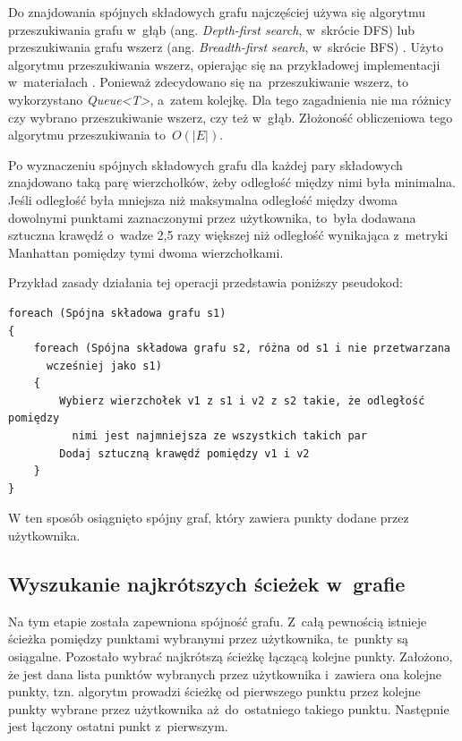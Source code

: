 \documentclass[a4paper,11pt,twoside,openright]{report}
\theoremstyle{definition}
\begin{document}
Do znajdowania spójnych składowych grafu najczęściej używa się algorytmu
przeszukiwania grafu w~głąb (ang. \textit{Depth-first search}, w~skrócie DFS) lub
przeszukiwania grafu wszerz (ang. \textit{Breadth-first search}, w~skrócie BFS)
\cite{Algorytmy Sedgewick}. Użyto algorytmu przeszukiwania wszerz, opierając się
na przykładowej implementacji w~materiałach \cite{AiSD2}. Ponieważ zdecydowano się
na~przeszukiwanie wszerz, to wykorzystano \textit{Queue<T>}, a~zatem kolejkę. Dla tego zagadnienia
nie ma różnicy czy wybrano przeszukiwanie wszerz, czy też w~głąb. Złożoność
obliczeniowa tego algorytmu przeszukiwania to~$O(|E|)$.

Po wyznaczeniu spójnych składowych grafu dla każdej pary składowych znajdowano
taką parę wierzchołków, żeby odległość między nimi była minimalna. Jeśli odległość
była mniejsza niż maksymalna odległość między dwoma dowolnymi punktami zaznaczonymi
przez użytkownika, to~była dodawana sztuczna krawędź o~wadze 2,5 razy większej
niż odległość wynikająca z~metryki Manhattan pomiędzy tymi dwoma wierzchołkami.

Przykład zasady działania tej operacji przedstawia poniższy pseudokod:

\begin{verbatim}
foreach (Spójna składowa grafu s1)
{
    foreach (Spójna składowa grafu s2, różna od s1 i nie przetwarzana
      wcześniej jako s1)
    {
        Wybierz wierzchołek v1 z s1 i v2 z s2 takie, że odległość pomiędzy
          nimi jest najmniejsza ze wszystkich takich par
        Dodaj sztuczną krawędź pomiędzy v1 i v2
    }
}
\end{verbatim}


W ten sposób osiągnięto spójny graf, który zawiera punkty dodane przez użytkownika.

\subsection {Wyszukanie najkrótszych ścieżek w~grafie}

Na tym etapie została zapewniona spójność grafu. Z~całą pewnością istnieje ścieżka
pomiędzy punktami wybranymi przez użytkownika, te~punkty są osiągalne. Pozostało
wybrać najkrótszą ścieżkę łączącą kolejne punkty. Założono, że jest dana lista
punktów wybranych przez użytkownika i~zawiera ona kolejne punkty, tzn. algorytm
prowadzi ścieżkę od pierwszego punktu przez kolejne punkty wybrane przez użytkownika
aż~do~ostatniego takiego punktu. Następnie jest łączony ostatni punkt z~pierwszym.
\end{document}
